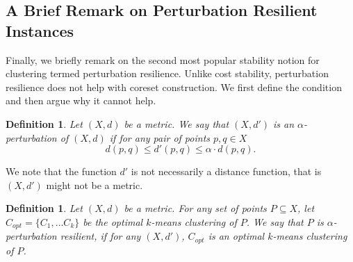 \documentclass[11pt]{article}
\newtheorem{definition}[lemma]{Definition}
\theoremstyle{restate}
\theoremstyle{definition}
\begin{document}
\subsection{A Brief Remark on Perturbation Resilient Instances}\label{sec: perturbation}
Finally, we briefly remark on the second most popular stability notion for clustering termed perturbation resilience.
Unlike cost stability, perturbation resilience does not help with coreset construction.
We first define the condition and then argue why it cannot help.
\begin{definition}
    Let $(X,d)$ be a metric. We say that $(X,d')$ is an $\alpha$-perturbation of $(X,d)$ if for any pair of points $p,q\in X$
    $$d(p,q) \leq d'(p,q) \leq \alpha\cdot d(p,q).$$
\end{definition}
We note that the function $d'$ is not necessarily a distance function, that is $(X,d')$ might not be a metric. 
\begin{definition}
    Let $(X,d)$ be a metric. For any set of points $P\subseteq X$, let $C_{opt} = \{C_1,\ldots C_k\}$ be the optimal $k$-means clustering of $P$. We say that $P$ is $\alpha$-perturbation resilient, if for any  $(X,d')$, $C_{opt}$ is an optimal $k$-means clustering of $P$.
\end{definition}
\end{document}
